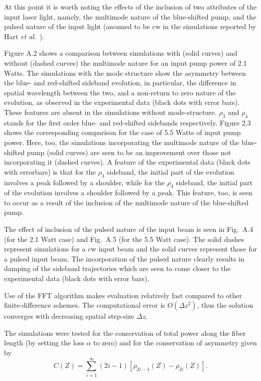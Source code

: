 At this point it is worth noting the effects of the inclusion of two attributes of 
the input laser light, namely, the multimode nature of the blue-shifted pump, and 
the pulsed nature of the input light (assumed to be cw in the simulations reported by 
Hart {\it et al}.\ \cite{hart1}). 

Figure A.2 shows a comparison between simulations with (solid curves) and without (dashed curves) the multimode nature for an input pump power of 2.1 Watts. The simulations with the mode structure show the asymmetry between the blue- and red-shifted sideband evolution, in particular, the difference in spatial wavelength between the two, and a non-return to zero nature of the evolution, as observed in the experimental data (black dots with error bars). These features are absent in the simulations without mode-structure. $\rho_3$ and $\rho_4$ stands for the first order blue- and red-shifted sidebands respectively.  Figure 2.3 shows the corresponding comparison for the case of 5.5 Watts of input pump power.  Here, too, the simulations incorporating the multimode nature of the blue-shifted pump (solid curves) are seen to be an improvement over those not incorporating it (dashed curves). A feature of the experimental data (black dots with errorbars) is that for the $\rho_3$ sideband, the initial part of the evolution involves a peak followed by a shoulder, while for the $\rho_4$ sideband, the initial part of the evolution involves a shoulder followed by a peak. This feature, too, is seen to occur as a result of the inclusion of the multimode nature of the blue-shifted pump.  

The effect of inclusion of the pulsed nature of the input beam is seen in Fig.\ A.4 (for the 2.1 Watt case) and Fig.\ A.5 (for the 5.5 Watt case). The solid dashes represent simulations for a cw input beam and the solid curves represent those for a pulsed input beam. The incorporation of the pulsed nature clearly results in damping of the sideband trajectories which are seen to come closer to the experimental data \cite{hart1} (black dots with error bars). 

Use of the FFT algorithm makes evaluation relatively fast compared to other 
finite-difference schemes. The computational error is $O(\Delta z^2)$, thus 
the solution converges with decreasing spatial step-size $\Delta z$. 

The simulations were tested for the conservation of total power along the 
fiber length (by setting the loss $\alpha$ to zero) and for the conservation 
of asymmetry \cite{thompson1,hart1} given by 
\begin{equation}
C(Z) = \sum_{i=1}^{\infty}(2i-1)[\rho_{2i-1}(Z)-\rho_{2i}(Z)] .
\end{equation}

